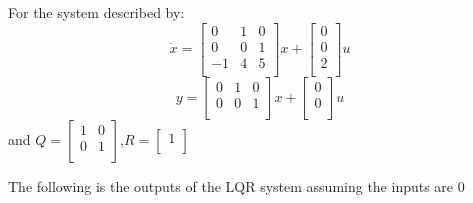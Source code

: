For the system described by: 
\begin{equation}
\dot x = \begin{bmatrix}
0&1&0\\
0&0&1\\
-1&4&5\\
\end{bmatrix}
x + \begin{bmatrix}
0\\
0\\
2\\
\end{bmatrix}
u
\end{equation}
\begin{equation}
y = \begin{bmatrix}
0&1&0\\
0&0&1\\
\end{bmatrix}
x + \begin{bmatrix}
0\\
0\\
\end{bmatrix}
u
\end{equation}
 and $Q = \begin{bmatrix}
1&0\\
0&1\\
\end{bmatrix}
$,$R = \begin{bmatrix}
1\\
\end{bmatrix}
$

The following is the outputs of the LQR system assuming the inputs are 0

